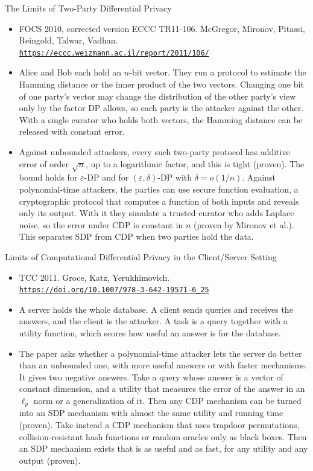 \documentclass[aspectratio=169,10pt]{beamer}
\newcommand{\venue}[3]{\item #1. #2.\\ \href{#3}{\nolinkurl{#3}}}
\begin{document}
\begin{frame}{The Limits of Two-Party Differential Privacy}
  \begin{itemize}
    \venue{FOCS 2010, corrected version ECCC TR11-106}{McGregor, Mironov, Pitassi, Reingold, Talwar, Vadhan}{https://eccc.weizmann.ac.il/report/2011/106/}
    \item Alice and Bob each hold an $n$-bit vector. They run a protocol to estimate the Hamming distance or the inner product of the two vectors. Changing one bit of one party's vector may change the distribution of the other party's view only by the factor DP allows, so each party is the attacker against the other. With a single curator who holds both vectors, the Hamming distance can be released with constant error.
    \item Against unbounded attackers, every such two-party protocol has additive error of order $\sqrt{n}$, up to a logarithmic factor, and this is tight (proven). The bound holds for $\varepsilon$-DP and for $(\varepsilon,\delta)$-DP with $\delta=o(1/n)$. Against polynomial-time attackers, the parties can use secure function evaluation, a cryptographic protocol that computes a function of both inputs and reveals only its output. With it they simulate a trusted curator who adds Laplace noise, so the error under CDP is constant in $n$ (proven by Mironov et al.). This separates SDP from CDP when two parties hold the data.
  \end{itemize}
\end{frame}

\begin{frame}{Limits of Computational Differential Privacy in the Client/Server Setting}
  \begin{itemize}
    \venue{TCC 2011}{Groce, Katz, Yerukhimovich}{https://doi.org/10.1007/978-3-642-19571-6_25}
    \item A server holds the whole database. A client sends queries and receives the answers, and the client is the attacker. A task is a query together with a utility function, which scores how useful an answer is for the database.
    \item The paper asks whether a polynomial-time attacker lets the server do better than an unbounded one, with more useful answers or with faster mechanisms. It gives two negative answers. Take a query whose answer is a vector of constant dimension, and a utility that measures the error of the answer in an $\ell_p$ norm or a generalization of it. Then any CDP mechanism can be turned into an SDP mechanism with almost the same utility and running time (proven). Take instead a CDP mechanism that uses trapdoor permutations, collision-resistant hash functions or random oracles only as black boxes. Then an SDP mechanism exists that is as useful and as fast, for any utility and any output (proven).
  \end{itemize}
\end{frame}
\end{document}
